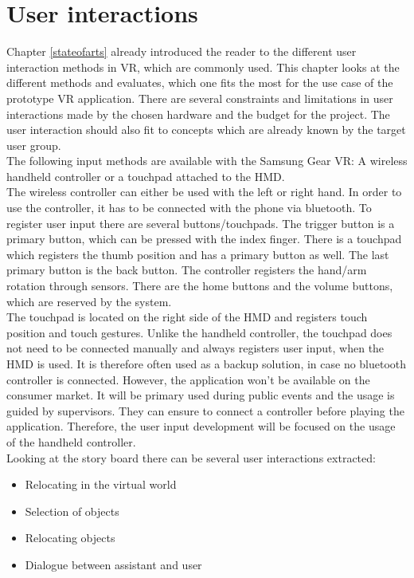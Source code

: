 \section{User interactions}

Chapter \ref{stateofarts} already introduced the reader to the different user interaction methods in VR, which are commonly used. This chapter looks at the different methods and evaluates, which one fits the most for the use case of the prototype VR application. There are several constraints and limitations in user interactions made by the chosen hardware and the budget for the project. The user interaction should also fit to concepts which are already known by the target user group.\\
The following input methods are available with the Samsung Gear VR: A wireless handheld controller or a touchpad attached to the HMD. \\
The wireless controller can either be used with the left or right hand. In order to use the controller, it has to be connected with the phone via bluetooth. To register user input there are several buttons/touchpads. The trigger button is a primary button, which can be pressed with the index finger. There is a touchpad which registers the thumb position and has a primary button as well. The last primary button is the back  button. The controller registers the hand/arm rotation through sensors. There are the home buttons and the volume buttons, which are reserved by the system.\\
The touchpad is located on the right side of the HMD and registers touch position and touch gestures. Unlike the handheld controller, the touchpad does not need to be connected manually and always registers user input, when the HMD is used. It is therefore often used as a backup solution, in case no bluetooth controller is connected. However, the application won't be available on the consumer market. It will be primary used during public events and the usage is guided by supervisors. They can ensure to connect a controller before playing the application. Therefore, the user input development will be focused on the usage of the handheld controller.\\
Looking at the story board there can be several user interactions extracted:
\begin{itemize}
\item Relocating in the virtual world
\item Selection of objects
\item Relocating objects
\item Dialogue between assistant and user
\end{itemize}
